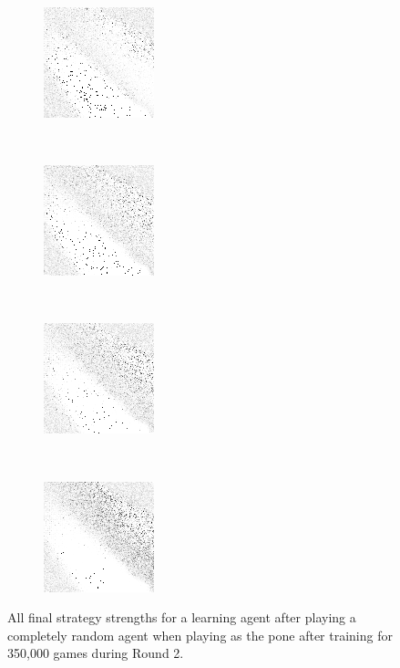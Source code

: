 \begin{figure}
	\begin{subfigure}[t]{0.22\textwidth}
		\includegraphics[width=\stratgraphwidth]{images/findings/round2/strats/random/crib_min_avg.png}
		\caption{\cribminavg}
	\end{subfigure}
	~
	\begin{subfigure}[t]{0.22\textwidth}
		\includegraphics[width=\stratgraphwidth]{images/findings/round2/strats/random/pegging_max_avg_gained.png}
		\caption{\peggingmaxavggained}
	\end{subfigure}
	~
	\begin{subfigure}[t]{0.22\textwidth}
		\includegraphics[width=\stratgraphwidth]{images/findings/round2/strats/random/pegging_max_med_gained.png}
		\caption{\peggingmaxmedgained}
	\end{subfigure}
	~
	\begin{subfigure}[t]{0.22\textwidth}
		\includegraphics[width=\stratgraphwidth]{images/findings/round2/strats/random/pegging_min_avg_given.png}
		\caption{\peggingminavggiven}
	\end{subfigure}

\caption{
	All final strategy strengths for a learning agent
	after playing a completely random agent
	when playing as the pone
	after training for 350,000 games during Round 2.
}
\label{fig:r2-strats-random}
\end{figure}
